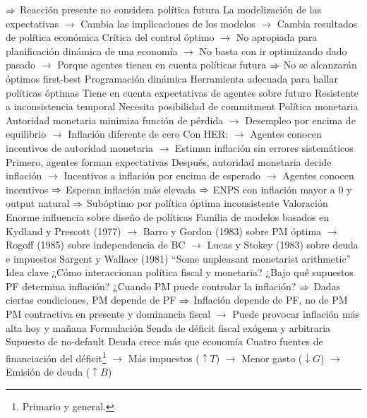 \documentclass{nuevotema}
\begin{document}
\begin{esquemal}
				\4[] $\Rightarrow$ Reacción presente no considera política futura
				\4[] La modelización de las expectativas
				\4[] $\to$ Cambia las implicaciones de los modelos
				\4[] $\to$ Cambia resultados de política económica
				\4[] Crítica del control óptimo
				\4[] $\to$ No apropiada para planificación dinámica de una economía
				\4[] $\to$ No basta con ir optimizando dado pasado
				\4[] $\to$ Porque agentes tienen en cuenta políticas futura
				\4[] $\Rightarrow$ No se alcanzarán óptimos first-best
				\4 Programación dinámica
				\4[] Herramienta adecuada para hallar políticas óptimas
				\4[] Tiene en cuenta expectativas de agentes sobre futuro
				\4[] Resistente a inconsistencia temporal
				\4[] Necesita posibilidad de commitment
				\4 Política monetaria
				\4[] Autoridad monetaria minimiza función de pérdida
				\4[] $\to$ Desempleo por encima de equilibrio
				\4[] $\to$ Inflación diferente de cero
				\4[] Con HER:
				\4[] $\to$ Agentes conocen incentivos de autoridad monetaria
				\4[] $\to$ Estiman inflación sin errores sistemáticos
				\4[] Primero, agentes forman expectativas
				\4[] Después, autoridad monetaria decide inflación
				\4[] $\to$ Incentivos a inflación por encima de esperado
				\4[] $\to$ Agentes conocen incentivos
				\4[] $\Rightarrow$ Esperan inflación más elevada
				\4[] $\Rightarrow$ ENPS con inflación mayor a 0 y output natural
				\4[] $\Rightarrow$ Subóptimo por política óptima inconsistente
				\4[] 
				\4 Valoración
				\4[] Enorme influencia sobre diseño de políticas
				\4[] Familia de modelos basados en Kydland y Prescott (1977)
				\4[] $\to$ Barro y Gordon (1983) sobre PM óptima
				\4[] $\to$ Rogoff (1985) sobre independencia de BC
				\4[] $\to$ Lucas y Stokey (1983) sobre deuda e impuestos
			\3 Sargent y Wallace (1981)
				\4 ``Some unpleasant monetarist arithmetic''
				\4 Idea clave
				\4[] ¿Cómo interaccionan política fiscal y monetaria?
				\4[] ¿Bajo qué supuestos PF determina inflación?
				\4[] ¿Cuando PM puede controlar la inflación?
				\4[] $\Rightarrow$ Dadas ciertas condiciones, PM depende de PF
				\4[] $\Rightarrow$ Inflación depende de PF, no de PM
				\4[] PM contractiva en presente y dominancia fiscal
				\4[] $\to$ Puede provocar inflación más alta hoy y mañana
				\4 Formulación
				\4[] Senda de déficit fiscal exógena y arbitraria
				\4[] Supuesto de no-default
				\4[] Deuda crece más que economía
				\4[] Cuatro fuentes de financiación del déficit\footnote{Primario y general.}
				\4[] $\to$ Más impuestos ($\uparrow T$)
				\4[] $\to$ Menor gasto ($\downarrow G$)
				\4[] $\to$ Emisión de deuda ($\uparrow B$)

\end{esquemal}
\end{document}
